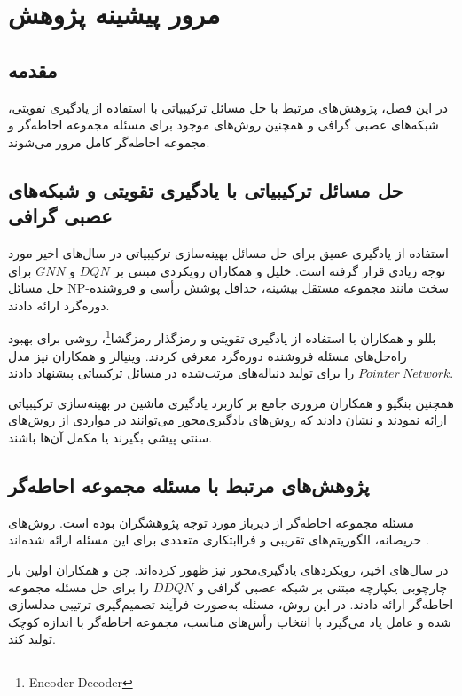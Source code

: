 \chapter{مرور پیشینه پژوهش}
\label{ch:literature}

\section{مقدمه}

در این فصل، پژوهش‌های مرتبط با حل مسائل ترکیبیاتی با استفاده از یادگیری تقویتی، شبکه‌های عصبی گرافی و همچنین روش‌های موجود برای مسئله مجموعه احاطه‌گر و مجموعه احاطه‌گر کامل مرور می‌شوند.

\section{حل مسائل ترکیبیاتی با یادگیری تقویتی و شبکه‌های عصبی گرافی}

استفاده از یادگیری عمیق برای حل مسائل بهینه‌سازی ترکیبیاتی در سال‌های اخیر مورد توجه زیادی قرار گرفته است. خلیل و همکاران \cite{khalil2017learning} رویکردی مبتنی بر $DQN$ و $GNN$ برای حل مسائل NP-سخت مانند مجموعه مستقل بیشینه، حداقل پوشش رأسی و فروشنده دوره‌گرد ارائه دادند.

بللو و همکاران \cite{bello2016neural} با استفاده از یادگیری تقویتی و رمزگذار-رمزگشا\footnote{Encoder-Decoder}، روشی برای بهبود راه‌حل‌های مسئله فروشنده دوره‌گرد معرفی کردند. وینیالز و همکاران \cite{vinyals2015pointer} نیز مدل $Pointer\ Network$ را برای تولید دنباله‌های مرتب‌شده در مسائل ترکیبیاتی پیشنهاد دادند.

همچنین بنگیو و همکاران \cite{bengio2021} مروری جامع بر کاربرد یادگیری ماشین در بهینه‌سازی ترکیبیاتی ارائه نمودند و نشان دادند که روش‌های یادگیری‌محور می‌توانند در مواردی از روش‌های سنتی پیشی بگیرند یا مکمل آن‌ها باشند.

\section{پژوهش‌های مرتبط با مسئله مجموعه احاطه‌گر}

مسئله مجموعه احاطه‌گر از دیرباز مورد توجه پژوهشگران بوده است. روش‌های حریصانه، الگوریتم‌های تقریبی و فراابتکاری متعددی برای این مسئله ارائه شده‌اند \cite{haynes1998fundamentals}.

در سال‌های اخیر، رویکردهای یادگیری‌محور نیز ظهور کرده‌اند. چن و همکاران \cite{chen2024dsp} اولین بار چارچوبی یکپارچه مبتنی بر شبکه عصبی گرافی و $DDQN$ را برای حل مسئله مجموعه احاطه‌گر ارائه دادند. در این روش، مسئله به‌صورت فرآیند تصمیم‌گیری ترتیبی مدلسازی شده و عامل یاد می‌گیرد با انتخاب رأس‌های مناسب، مجموعه احاطه‌گر با اندازه کوچک تولید کند.

